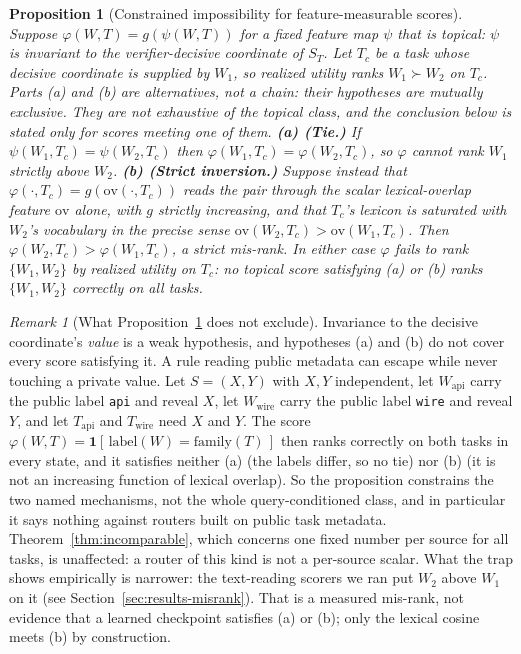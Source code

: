\documentclass[11pt]{article}
\theoremstyle{plain}
\newtheorem{proposition}{Proposition}
\theoremstyle{definition}
\theoremstyle{remark}
\newtheorem{remark}{Remark}
\begin{document}
\begin{proposition}[Constrained impossibility for feature-measurable scores]
\label{prop:trap-constrained}
Suppose $\varphi(W,T)=g(\psi(W,T))$ for a fixed feature map $\psi$ that is \emph{topical}: $\psi$
is invariant to the verifier-decisive coordinate of $S_T$. Let $T_c$ be a task whose decisive
coordinate is supplied by $W_1$, so realized utility ranks $W_1\succ W_2$ on $T_c$. Parts
\textup{(a)} and \textup{(b)} are \emph{alternatives}, not a chain: their hypotheses are mutually
exclusive. They are not exhaustive of the topical class, and the conclusion below is stated only
for scores meeting one of them.
\textbf{(a) (Tie.)} If $\psi(W_1,T_c)=\psi(W_2,T_c)$ then $\varphi(W_1,T_c)=\varphi(W_2,T_c)$, so
$\varphi$ cannot rank $W_1$ strictly above $W_2$.
\textbf{(b) (Strict inversion.)} Suppose instead that $\varphi(\cdot,T_c)=g(\mathrm{ov}(\cdot,T_c))$
reads the pair through the scalar lexical-overlap feature $\mathrm{ov}$ alone, with $g$ strictly
increasing, and that $T_c$'s lexicon is saturated with $W_2$'s vocabulary in the precise sense
$\mathrm{ov}(W_2,T_c) > \mathrm{ov}(W_1,T_c)$. Then $\varphi(W_2,T_c) > \varphi(W_1,T_c)$, a strict
mis-rank. In either case $\varphi$ fails to rank $\{W_1,W_2\}$ by realized utility on $T_c$: no
topical score satisfying \textup{(a)} or \textup{(b)} ranks $\{W_1,W_2\}$ correctly on all tasks.
\end{proposition}

\begin{remark}[What Proposition~\ref{prop:trap-constrained} does not exclude]
\label{rem:trapscope}
Invariance to the decisive coordinate's \emph{value} is a weak hypothesis, and hypotheses
\textup{(a)} and \textup{(b)} do not cover every score satisfying it. A rule reading public
metadata can escape while never touching a private value. Let $S=(X,Y)$ with $X,Y$ independent,
let $W_{\mathrm{api}}$ carry the public label \texttt{api} and reveal $X$, let
$W_{\mathrm{wire}}$ carry the public label \texttt{wire} and reveal $Y$, and let $T_{\mathrm{api}}$
and $T_{\mathrm{wire}}$ need $X$ and $Y$. The score $\varphi(W,T)=\mathbf 1[\,\text{label}(W) =
\text{family}(T)\,]$ then ranks correctly on both tasks in every state, and it satisfies neither
\textup{(a)} (the labels differ, so no tie) nor \textup{(b)} (it is not an increasing function of
lexical overlap). So the proposition constrains the two named mechanisms, not the whole
query-conditioned class, and in particular it says nothing against routers built on public task
metadata. Theorem~\ref{thm:incomparable}, which concerns one fixed number per source for all
tasks, is unaffected: a router of this kind is not a per-source scalar. What the trap shows
empirically is narrower: the text-reading scorers we ran put $W_2$ above $W_1$ on it
(see Section~\ref{sec:results-misrank}). That is a measured mis-rank, not evidence that a
learned checkpoint satisfies \textup{(a)} or \textup{(b)}; only the lexical cosine meets
\textup{(b)} by construction.
\end{remark}
\end{document}
